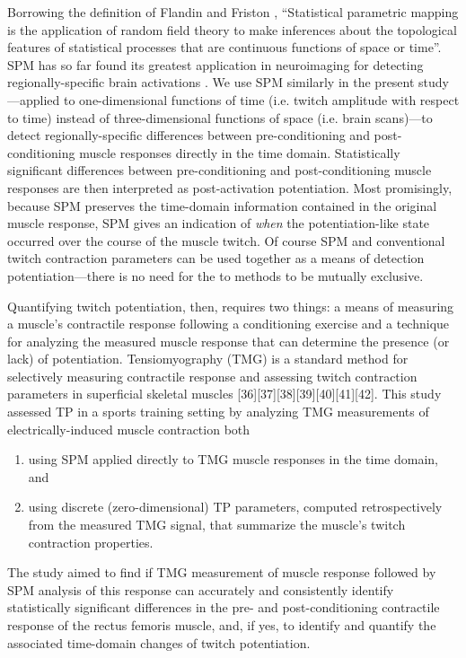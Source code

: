 \documentclass[utf8]{style/FrontiersinHarvard}
\begin{document}
Borrowing the definition of Flandin and Friston \cite{flandin}, 
``Statistical parametric mapping is the application of random field theory to make inferences about the topological features of statistical processes that are continuous functions of space or time''.
SPM has so far found its greatest application in neuroimaging for detecting regionally-specific brain activations \cite{friston}.
We use SPM similarly in the present study---applied to one-dimensional functions of time (i.e. twitch amplitude with respect to time) instead of three-dimensional functions of space (i.e. brain scans)---to detect regionally-specific differences between pre-conditioning and post-conditioning muscle responses directly in the time domain.
Statistically significant differences between pre-conditioning and post-conditioning muscle responses are then interpreted as post-activation potentiation.
Most promisingly, because SPM preserves the time-domain information contained in the original muscle response, SPM gives an indication of \textit{when} the potentiation-like state occurred over the course of the muscle twitch.
Of course SPM and conventional twitch contraction parameters can be used together as a means of detection potentiation---there is no need for the to methods to be mutually exclusive.

Quantifying twitch potentiation, then, requires two things: a means of measuring a muscle's contractile response following a conditioning exercise and a technique for analyzing the measured muscle response that can determine the presence (or lack) of potentiation.
Tensiomyography (TMG) is a standard method for selectively measuring contractile response and assessing twitch contraction parameters in superficial skeletal muscles [36][37][38][39][40][41][42].
This study assessed TP in a sports training setting by analyzing TMG measurements of electrically-induced muscle contraction both
\begin{enumerate}

    \item using SPM applied directly to TMG muscle responses in the time domain, and

    \item using discrete (zero-dimensional) TP parameters, computed retrospectively from the measured TMG signal, that summarize the muscle's twitch contraction properties.

\end{enumerate}
The study aimed to find if TMG measurement of muscle response followed by SPM analysis of this response can accurately and consistently identify statistically significant differences in the pre- and post-conditioning contractile response of the rectus femoris muscle, and,
if yes, to identify and quantify the associated time-domain changes of twitch potentiation.
\end{document}

